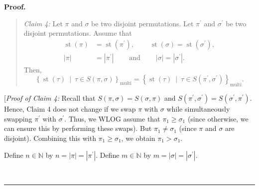 \documentclass[numbers=enddot,12pt,final,onecolumn,notitlepage]{scrartcl}%
\theoremstyle{definition}
\newenvironment{statement}{\begin{quote}}{\end{quote}}
\newenvironment{proof}[1][Proof]{\noindent\textbf{#1.} }{\ \rule{0.5em}{0.5em}}
\newenvironment{verlong}{}{}
\begin{document}
\begin{verlong}
\begin{proof}
\begin{statement}
\textit{Claim 4:} Let $\pi$ and $\sigma$ be two disjoint permutations. Let
$\pi^{\prime}$ and $\sigma^{\prime}$ be two disjoint permutations. Assume that%
\begin{align*}
\operatorname*{st}\left(  \pi\right)   &  =\operatorname*{st}\left(
\pi^{\prime}\right)  ,\ \ \ \ \ \ \ \ \ \ \operatorname*{st}\left(
\sigma\right)  =\operatorname*{st}\left(  \sigma^{\prime}\right)  ,\\
\left\vert \pi\right\vert  &  =\left\vert \pi^{\prime}\right\vert
\ \ \ \ \ \ \ \ \ \ \text{and}\ \ \ \ \ \ \ \ \ \ \left\vert \sigma\right\vert
=\left\vert \sigma^{\prime}\right\vert .
\end{align*}
Then,
\[
\left\{  \operatorname*{st}\left(  \tau\right)  \ \mid\ \tau\in S\left(
\pi,\sigma\right)  \right\}  _{\operatorname*{multi}}=\left\{
\operatorname*{st}\left(  \tau\right)  \ \mid\ \tau\in S\left(  \pi^{\prime
},\sigma^{\prime}\right)  \right\}  _{\operatorname*{multi}}.
\]

\end{statement}

[\textit{Proof of Claim 4:} Recall that $S\left(  \pi,\sigma\right)  =S\left(
\sigma,\pi\right)  $ and $S\left(  \pi^{\prime},\sigma^{\prime}\right)
=S\left(  \sigma^{\prime},\pi^{\prime}\right)  $. Hence, Claim 4 does not
change if we swap $\pi$ with $\sigma$ while simultaneously swapping
$\pi^{\prime}$ with $\sigma^{\prime}$. Thus, we WLOG assume that $\pi_{1}%
\geq\sigma_{1}$ (since otherwise, we can ensure this by performing these
swaps). But $\pi_{1}\neq\sigma_{1}$ (since $\pi$ and $\sigma$ are disjoint).
Combining this with $\pi_{1}\geq\sigma_{1}$, we obtain $\pi_{1}>\sigma_{1}$.

Define $n\in\mathbb{N}$ by $n=\left\vert \pi\right\vert =\left\vert
\pi^{\prime}\right\vert $. Define $m\in\mathbb{N}$ by $m=\left\vert
\sigma\right\vert =\left\vert \sigma^{\prime}\right\vert $.


\end{proof}
\end{verlong}
\end{document}
